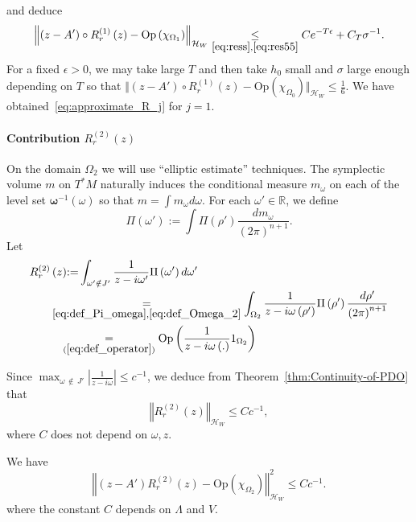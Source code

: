 \documentclass[AHL,Unicode,longabstracts,published]{cedram}
\newcommand*\eq[1]{\underset{(#1)}{=}}
\newcommand{\clH}{\mathcal{H}}
\newcommand{\Opp}{\mathrm{Op}}
\newcommand{\bbR}{\mathbb{R}}
\newcommand{\clH}{\mathcal{H}}
\newcommand{\bbR}{\mathbb{R}}
\begin{document}
and deduce
\[
\left\Vert \left(z-A'\right)\circ R_{r}^{\left(1\right)}\left(z\right)-\Opp \left(\chi_{\Omega_{1}}\right)\right\Vert _{\clH _{W}}\underset{\eqref{eq:ress},\eqref{eq:res55}}{\leq}Ce^{-T\epsilon}+C_{T}\sigma^{-1}.
\]
For a fixed $\epsilon>0$, we may take large $T$ and then take $h_{0}$ small and $\sigma$ large enough depending on $T$ so that $\Vert (z-A')\circ R_{r}^{(1)}(z)-\Opp (\chi_{\Omega_{0}})\Vert _{\clH _{W}}\leq\frac{1}{6}$. We have obtained~\eqref{eq:approximate_R_j} for $j=1$.


\paragraph{Contribution $R_{r}^{(2)}(z)$}

On the domain $\Omega_{2}$ we will use ``elliptic estimate'' techniques. The symplectic volume $m$ on $T^{*}M$ naturally induces the conditional measure $m_{\omega}$ on each of the level set $\boldsymbol{\omega}{}^{-1}(\omega)$ so that $m=\int m_{\omega}d\omega$. For each $\omega'\in\bbR$, we define
\begin{equation}\label{eq:def_Pi_omega}
\Pi\left(\omega'\right):=\int\Pi\left(\rho'\right)\frac{dm_{\omega}}{\left(2\pi\right)^{n+1}}.
\end{equation}
Let
\begin{align*}
R_{r}^{\left(2\right)}\left(z\right) &{:=}\int_{\omega'\notin J'}\frac{1}{z-i\omega'}\Pi\left(\omega'\right)d\omega'\\
& \mkern-28mu\underset{\eqref{eq:def_Pi_omega},\eqref{eq:def_Omega_2}}{=}\int_{\Omega_{2}}\frac{1}{z-i\omega\left(\rho'\right)}\Pi\left(\rho'\right)\frac{d\rho'}{\left(2\pi\right)^{n+1}}\\
& \mkern-11mu\eq{\ref{eq:def_operator}}\Opp \left(\frac{1}{z-i\omega\left(.\right)}\mathrm{1}_{\Omega_{2}}\right)
\end{align*}

Since $\max_{\omega\,\notin\,J'}|\frac{1}{z-i\omega}|\leq c^{-1}$, we deduce from Theorem~\ref{thm:Continuity-of-PDO} that
\begin{equation}\label{eq:norm_B}
\left\Vert R_{r}^{\left(2\right)}\left(z\right)\right\Vert _{\clH _{W}}\le Cc^{-1},
\end{equation}
where $C$ does not depend on $\omega,z$.

\begin{lemm}\label{lem:bound_norm_D}
We have
\begin{equation}\label{eq:norm_D}
\left\Vert \left(z-A'\right)R_{r}^{\left(2\right)}\left(z\right)-\Opp \left(\chi_{\Omega_{2}}\right)\right\Vert _{\clH _{W}}^{2}\le Cc^{-1}.
\end{equation}
where the constant $C$ depends on $\Lambda$ and $V$.
\end{lemm}
\end{document}
